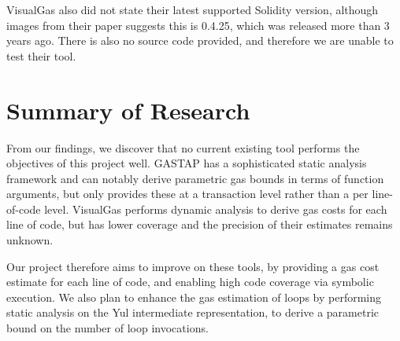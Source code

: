 VisualGas also did not state their latest supported Solidity version, although images from their
paper suggests this is 0.4.25, which was released more than 3 years ago. There is also no source code
provided, and therefore we are unable to test their tool.



\section{Summary of Research}
From our findings, we discover that no current existing tool performs the objectives of this project
well. GASTAP has a sophisticated static analysis framework and can notably derive parametric gas
bounds in terms of function arguments, but only provides these at a transaction level rather than
a per line-of-code level. VisualGas performs dynamic analysis to derive gas costs for each line of
code, but has lower coverage and the precision of their estimates remains unknown.

Our project therefore aims to improve on these tools, by providing a gas cost estimate for each line
of code, and enabling high code coverage via symbolic execution. We also plan to enhance the 
gas estimation of loops by performing static analysis on the Yul intermediate representation,
to derive a parametric bound on the number of loop invocations.
